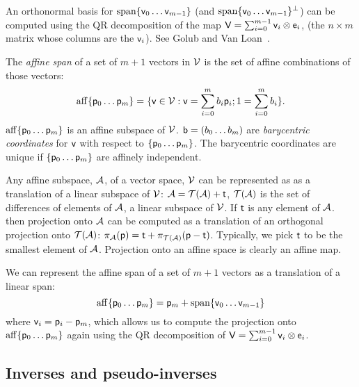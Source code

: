 An orthonormal basis for $\linear_span\{ \v_0 \ldots \v_{m-1} \}$
(and $\linear_span\{ \v_0 \ldots \v_{m-1} \}^\perp$)
can be computed using the QR decomposition
of the map $\mathsf{V} = \sum_{i=0}^{m-1} \mathsf{v}_i \otimes \mathsf{e}_i$,
(the $n \times m$ matrix whose columns are the $\mathsf{v}_i$).
See Golub and Van Loan~\cite[sec.~5.2]{golub-vanloan-1996}.

The {\it affine span} of a set of $m+1$ vectors in $\mathcal{V}$
is the set of affine combinations of those vectors:
\begin{equation}
\affine_span\{ \p_0 \ldots \p_{m} \} = \{\v \in \Vspace : \v = \sum_{i=0}^{m} b_i \p_i;
1 = \sum_{i=0}^{m} b_i \}.
\end{equation}
$\affine_span\{ \p_0 \ldots \p_{m} \}$ is an affine subspace of $\mathcal{V}$.
$\mathsf{b} = ( b_0 \ldots b_m )$ are {\it barycentric coordinates}
for $\mathsf{v}$ with respect to $\{ \mathsf{p}_0 \ldots \mathsf{p}_{m} \}$.
The barycentric coordinates are unique if $\{ \mathsf{p}_0 \ldots \mathsf{p}_{m} \}$
are affinely independent.

Any affine subspace, $\mathcal{A}$, of a vector space, $\mathcal{V}$ can be represented as
as a translation of a linear subspace of $\mathcal{V}$:
$\mathcal{A} = \mathcal{T}(\mathcal{A}) + \mathsf{t}$,
$\mathcal{T}(\mathcal{A})$ is the set of differences of elements of $\mathcal{A}$,
a linear subspace of $\mathcal{V}$.
If $\mathsf{t}$ is any element of $\mathcal{A}$.
then projection onto $\mathcal{A}$
can be computed as a translation of an orthogonal projection onto $\mathcal{T}(\mathcal{A})$:
$\pi_{\mathcal{A}} (\mathsf{p}) = \mathsf{t} + \pi_{\mathcal{T}(\mathcal{A})} (\mathsf{p} - \mathsf{t})$.
Typically, we pick $\mathsf{t}$ to be the smallest element of $\mathcal{A}$.
Projection onto an affine space is clearly an affine map.

We can represent the affine span of a set of $m+1$ vectors
as a translation of a linear span:
\begin{equation}
\affine_span\{ \p_0 \ldots \p_{m} \} = \p_m + \linear_span\{\v_0 \ldots \v_{m-1}\}
\end{equation}
where $\mathsf{v}_i = \mathsf{p}_i - \mathsf{p}_m$,
which allows us to compute the projection onto
$\affine_span\{ \p_0 \ldots \p_{m} \}$
again using the QR decomposition
of $\mathsf{V} = \sum_{i=0}^{m-1} \mathsf{v}_i \otimes \mathsf{e}_i$.


\subsection{Inverses and pseudo-inverses}
\label{sec:Inverses-and-pseudo-inverses}

